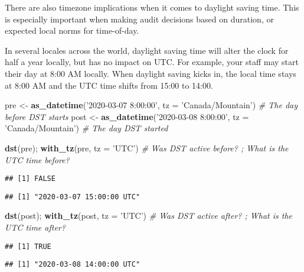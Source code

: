 \documentclass[
]{book}
\newenvironment{Shaded}{\begin{snugshade}}{\end{snugshade}}
\newcommand{\CommentTok}[1]{\textcolor[rgb]{0.56,0.35,0.01}{\textit{#1}}}
\newcommand{\DataTypeTok}[1]{\textcolor[rgb]{0.13,0.29,0.53}{#1}}
\newcommand{\KeywordTok}[1]{\textcolor[rgb]{0.13,0.29,0.53}{\textbf{#1}}}
\newcommand{\NormalTok}[1]{#1}
\newcommand{\StringTok}[1]{\textcolor[rgb]{0.31,0.60,0.02}{#1}}
\begin{document}
There are also timezone implications when it comes to daylight saving time. This is especially important when making audit decisions based on duration, or expected local norms for time-of-day.

In several locales across the world, daylight saving time will alter the clock for half a year locally, but has no impact on UTC. For example, your staff may start their day at 8:00 AM locally. When daylight saving kicks in, the local time stays at 8:00 AM and the UTC time shifts from 15:00 to 14:00.

\begin{Shaded}
\begin{Highlighting}[]
\NormalTok{pre <-}\StringTok{ }\KeywordTok{as_datetime}\NormalTok{(}\StringTok{'2020-03-07 8:00:00'}\NormalTok{, }\DataTypeTok{tz =} \StringTok{'Canada/Mountain'}\NormalTok{) }\CommentTok{# The day before DST starts}
\NormalTok{post <-}\StringTok{ }\KeywordTok{as_datetime}\NormalTok{(}\StringTok{'2020-03-08 8:00:00'}\NormalTok{, }\DataTypeTok{tz =} \StringTok{'Canada/Mountain'}\NormalTok{) }\CommentTok{# The day DST started}

\KeywordTok{dst}\NormalTok{(pre); }\KeywordTok{with_tz}\NormalTok{(pre, }\DataTypeTok{tz =} \StringTok{'UTC'}\NormalTok{) }\CommentTok{# Was DST active before? ; What is the UTC time before? }
\end{Highlighting}
\end{Shaded}

\begin{verbatim}
## [1] FALSE
\end{verbatim}

\begin{verbatim}
## [1] "2020-03-07 15:00:00 UTC"
\end{verbatim}

\begin{Shaded}
\begin{Highlighting}[]
\KeywordTok{dst}\NormalTok{(post); }\KeywordTok{with_tz}\NormalTok{(post, }\DataTypeTok{tz =} \StringTok{'UTC'}\NormalTok{) }\CommentTok{# Was DST active after? ; What is the UTC time after?}
\end{Highlighting}
\end{Shaded}

\begin{verbatim}
## [1] TRUE
\end{verbatim}

\begin{verbatim}
## [1] "2020-03-08 14:00:00 UTC"
\end{verbatim}
\end{document}
